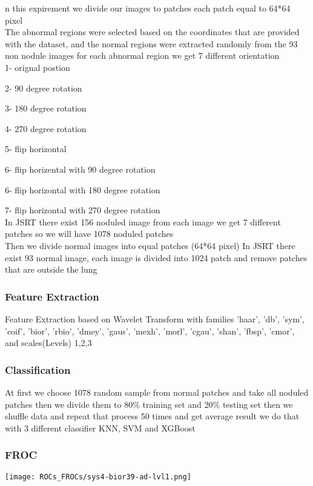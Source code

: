 \documentclass[hidelinks,12pt,xcolor=table]{article}
\begin{document}
\begin{multicols}{2}
n this expirement we divide our images to patches each patch equal to 64*64 pixel\\
The abnormal regions were selected based on the
coordinates that are provided with the dataset, and the
normal regions were extracted randomly from the 93 non nodule images
for each abnormal region we get 7 different orientation\\

1- orignal postion

2- 90 degree rotation

3- 180 degree rotation

4- 270 degree rotation

5- flip horizontal

6- flip horizental with 90 degree rotation

6- flip horizontal with 180 degree rotation

7- flip horizontal with 270 degree rotation\\

In JSRT there exist 156 noduled image
from each image we get 7 different patches
so we will have 1078 noduled patches\\

Then we divide normal images into equal patches (64*64 pixel)
In JSRT there exist 93 normal image, 
each image is divided into 1024 patch and remove patches that are outside the lung

\subsubsection{Feature Extraction}
Feature Extraction based on Wavelet Transform with families
'haar', 'db', 'sym', 'coif', 'bior', 'rbio', 'dmey', 'gaus',
'mexh', 'morl', 'cgau', 'shan', 'fbsp', 'cmor',
and scales(Levels) 1,2,3 

\subsubsection{Classification}
At first we choose 1078 random sample from normal patches and take all noduled patches 
then we divide them to 80\% training set and 20\% testing set then we shuffle data and repeat that process 50 times and get average result we do that with 3 different classifier KNN, SVM and XGBoost



\subsubsection{FROC}
\begin{center}
  \centering
  \texttt{[image: ROCs\_FROCs/sys4-bior39-ad-lvl1.png]}
  \label{fig:sys1-db23-ad-lvl5}
\end{center}


\end{multicols}
\end{document}
